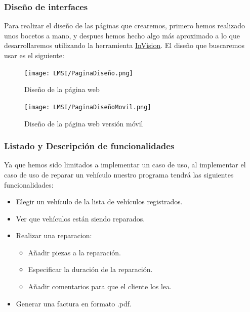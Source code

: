 \documentclass{article}
\begin{document}
\subsubsection{Diseño de interfaces}
Para realizar el diseño de las páginas que crearemos, primero hemos realizado unos bocetos a mano, y despues hemos hecho algo más aproximado a lo que desarrollaremos utilizando
la herramienta \href{https://www.invisionapp.com/home}{InVision}. El diseño que buscaremos usar es el siguiente:\\
\begin{figure}[H]
  \centering
  \texttt{[image: LMSI/PaginaDiseño.png]}
  \caption{Diseño de la página web}
\end{figure}
\begin{figure}[H]
  \centering
  \texttt{[image: LMSI/PaginaDiseñoMovil.png]}
  \caption{Diseño de la página web versión móvil}
\end{figure}
\subsubsection{Listado y Descripción de funcionalidades}
Ya que hemos sido limitados a implementar un caso de uso, al implementar el caso de uso de reparar un vehículo nuestro programa tendrá las siguientes funcionalidades:\\
\begin{itemize}
  \item Elegir un vehículo de la lista de vehículos registrados.
  \item Ver que vehículos están siendo reparados.
  \item Realizar una reparacion: \begin{itemize}
    \item Añadir piezas a la reparación.
    \item Especificar la duración de la reparación.
    \item Añadir comentarios para que el cliente los lea.
  \end{itemize}
  \item Generar una factura en formato .pdf.
\end{itemize}
\end{document}
